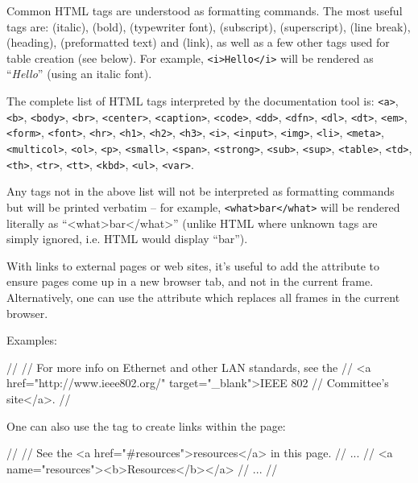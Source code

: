 Common HTML tags are understood as formatting commands.
The most useful tags are:  (italic),
 (bold),  (typewriter font),
 (subscript),  (superscript),
 (line break),  (heading),
 (preformatted text) and  (link),
as well as a few other tags used for table creation (see below).
For example, \texttt{<i>Hello</i>} will be rendered as ``\textit{Hello}''
(using an italic font).

The complete list of HTML tags interpreted by the documentation tool is:
\texttt{<a>}, \texttt{<b>}, \texttt{<body>}, \texttt{<br>}, \texttt{<center>},
\texttt{<caption>}, \texttt{<code>}, \texttt{<dd>}, \texttt{<dfn>}, \texttt{<dl>},
\texttt{<dt>}, \texttt{<em>}, \texttt{<form>}, \texttt{<font>}, \texttt{<hr>},
\texttt{<h1>}, \texttt{<h2>}, \texttt{<h3>}, \texttt{<i>}, \texttt{<input>}, \texttt{<img>},
\texttt{<li>}, \texttt{<meta>}, \texttt{<multicol>}, \texttt{<ol>}, \texttt{<p>}, \texttt{<small>},
\texttt{<span>}, \texttt{<strong>},
\texttt{<sub>}, \texttt{<sup>}, \texttt{<table>}, \texttt{<td>}, \texttt{<th>}, \texttt{<tr>},
\texttt{<tt>}, \texttt{<kbd>}, \texttt{<ul>}, \texttt{<var>}.

Any tags not in the above list will not be interpreted as formatting commands
but will be printed verbatim -- for example, \texttt{<what>bar</what>}
will be rendered literally as ``<what>bar</what>'' (unlike HTML where
unknown tags are simply ignored, i.e. HTML would display ``bar'').

With links to external pages or web sites, it's useful to add the
 attribute to ensure pages come up in a new browser
tab, and not in the current frame. Alternatively, one can use the
 attribute which replaces all frames in the current
browser.

Examples:

\begin{ned}
//
// For more info on Ethernet and other LAN standards, see the
// <a href="http://www.ieee802.org/" target="_blank">IEEE 802
// Committee's site</a>.
//
\end{ned}

One can also use the  tag to create links within the page:

\begin{ned}
//
// See the <a href="#resources">resources</a> in this page.
// ...
// <a name="resources"><b>Resources</b></a>
// ...
//
\end{ned}


